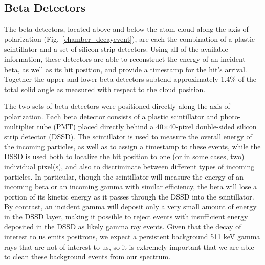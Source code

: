
\subsection{Beta Detectors}
\label{section:betadetectors}
The beta detectors, located above and below the atom cloud along the axis of polarization (Fig.~\ref{chamber_decayevent}), are each the combination of a plastic scintillator and a set of silicon strip detectors.  Using all of the available information, these detectors are able to reconstruct the energy of an incident beta, as well as its hit position, and provide a timestamp for the hit's arrival.  Together the upper and lower beta detectors subtend approximately 1.4\% of the total solid angle as measured with respect to the cloud position. 

	The two sets of beta detectors were positioned directly along the axis of polarization.  Each beta detector consists of a plastic scintillator and photo-multiplier tube (PMT)  placed directly behind a 40$\times$40-pixel double-sided silicon strip detector (DSSD).    The scintillator is used to measure the overall energy of the incoming particles, as well as to assign a timestamp to these events, while the DSSD is used both to localize the hit position to one (or in some cases, two) individual pixel(s), and also to discriminate between different types of incoming particles.  In particular, though the scintillator will measure the energy of an incoming beta or an incoming gamma with similar efficiency, the beta will lose a portion of its kinetic energy as it passes through the DSSD into the scintillator.  By contrast, an incident gamma will deposit only a very small amount of energy in the DSSD layer, making it possible to reject events with insufficient energy deposited in the DSSD as likely gamma ray events.  Given that the decay of interest to us emits positrons, we expect a persistent background 511 keV gamma rays that are not of interest to us, so it is extremely important that we are able to clean these background events from our spectrum. 


